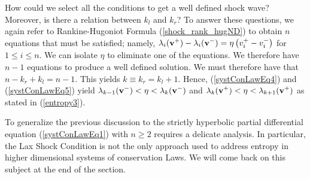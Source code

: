 How could we select all the conditions to get a well defined shock
wave?  Moreover, is there a relation between $k_l$ and $k_r$?
To answer these questions, we again refer to Rankine-Hugoniot Formula
(\ref{shock_rank_hugND}) to obtain $n$ equations that must be
satisfied; namely,
$\displaystyle \lambda_i(\mathbf{v}^+)-\lambda_i(\mathbf{v}^-)
= \eta \left(v_i^+ - v_i^- \right)$
for $1\leq i \leq n$.   We can isolate $\eta$ to eliminate one of
the equations.  We therefore have $n-1$ equations to produce a well
defined solution.  We must therefore have that
$n-k_r + k_l = n-1$.  This yields $k \equiv k_r = k_l + 1$.  Hence,
(\ref{systConLawEq4}) and (\ref{systConLawEq5}) yield
$\displaystyle
\lambda_{k-1}(\mathbf{v}^-) < \eta < \lambda_k(\mathbf{v}^-)$
and $\displaystyle
\lambda_k(\mathbf{v}^+) < \eta < \lambda_{k+1}(\mathbf{v}^+)$
as stated in (\ref{entropy3}).

To generalize the previous discussion to the strictly hyperbolic partial
differential equation (\ref{systConLawEq1}) with $n \geq 2$ requires a
delicate analysis.  In particular, the Lax Shock Condition is not the
only approach used to address entropy in higher dimensional systems 
of conservation Laws.  We will come back on this subject at the end of
the section.

